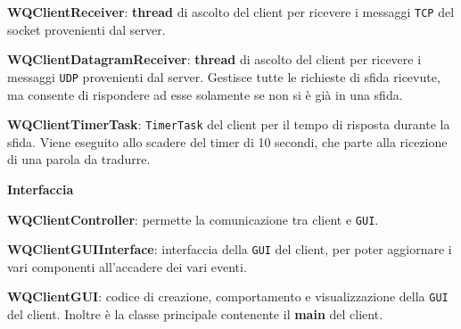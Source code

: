 \documentclass[10pt]{article}
\begin{document}
{\begin{list}{}{\textbf{Client}}
	\item \textbf{WQClientReceiver}: \textbf{thread} di ascolto del client per ricevere i messaggi \texttt{TCP} del socket provenienti dal server.
	\item \textbf{WQClientDatagramReceiver}: \textbf{thread} di ascolto del client per ricevere i messaggi \texttt{UDP} provenienti dal server. Gestisce tutte le richieste di sfida ricevute, ma consente di rispondere ad esse solamente se non si è già in una sfida.
	\item \textbf{WQClientTimerTask}: \texttt{TimerTask} del client per il tempo di risposta durante la sfida. Viene eseguito allo scadere del timer di 10 secondi, che parte alla ricezione di una parola da tradurre.
	\item \textbf{Interfaccia}
	\item \textbf{WQClientController}: permette la comunicazione tra client e \texttt{GUI}.
	\item \textbf{WQClientGUIInterface}: interfaccia della \texttt{GUI} del client, per poter aggiornare i vari componenti all'accadere dei vari eventi.
	\item \textbf{WQClientGUI}: codice di creazione, comportamento e visualizzazione della \texttt{GUI} del client. Inoltre è la classe principale contenente il \textbf{main} del client.
\end{list}
}
\end{document}
